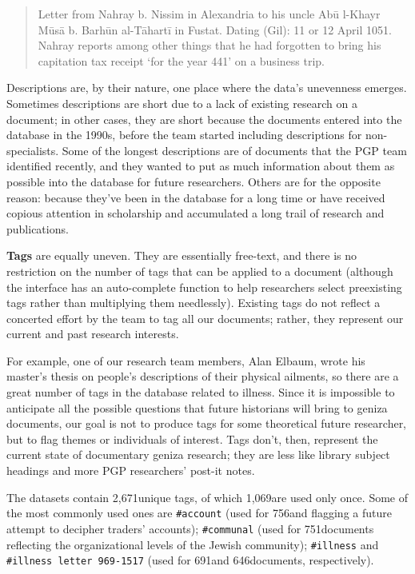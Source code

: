 \documentclass{article}
\def\uniqueTags{2,671}
\def\taggedAccount{756}
\def\taggedCommunal{751}
\def\taggedIllness{691}
\def\taggedIllnessLetter{646}
\def\singletonTags{1,069}
\begin{document}
\begin{quote}
Letter from Nahray b. Nissim in Alexandria to his uncle Abū l-Khayr Mūsā b. Barhūn al-Tāhartī in Fustat. Dating (Gil): 11 or 12 April 1051. Nahray reports among other things that he had forgotten to bring his capitation tax receipt ‘for the year 441’ on a business trip. \autocite{noauthor_letter_1050}
\end{quote}
Descriptions are, by their nature, one place where the data’s unevenness emerges. Sometimes descriptions are short due to a lack of existing research on a document; in other cases, they are short because the documents entered into the database in the 1990s, before the team started including descriptions for non-specialists. Some of the longest descriptions are of documents that the PGP team identified recently, and they wanted to put as much information about them as possible into the database for future researchers. Others are for the opposite reason: because they’ve been in the database for a long time or have received copious attention in scholarship and accumulated a long trail of research and publications. 

\textbf{Tags} are equally uneven. They are essentially free-text, and there is no restriction on the number of tags that can be applied to a document (although the interface has an auto-complete function to help researchers select preexisting tags rather than multiplying them needlessly). Existing tags do not reflect a concerted effort by the team to tag all our documents; rather, they represent our current and past research interests. 

For example, one of our research team members, Alan Elbaum, wrote his master’s thesis on people’s descriptions of their physical ailments, so there are a great number of tags in the database related to illness. Since it is impossible to anticipate all the possible questions that future historians will bring to geniza documents, our goal is not to produce tags for some theoretical future researcher, but to flag themes or individuals of interest. Tags don’t, then, represent the current state of documentary geniza research; they are less like library subject headings and more PGP researchers’ post-it notes.

The datasets contain \uniqueTags\space unique tags, of which \singletonTags\space are used only once. Some of the most commonly used ones are \texttt{\#account} (used for \taggedAccount\space and flagging a future attempt to decipher traders’ accounts); \texttt{\#communal} (used for \taggedCommunal\space documents reflecting the organizational levels of the Jewish community); \texttt{\#illness} and \texttt{\#illness letter 969-1517}  (used for \taggedIllness\space and \taggedIllnessLetter\space documents, respectively). 
\end{document}
